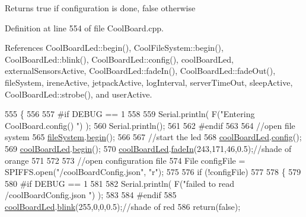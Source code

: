 \begin{DoxyReturn}{Returns}
true if configuration is done, false otherwise 
\end{DoxyReturn}


Definition at line 554 of file Cool\+Board.\+cpp.



References Cool\+Board\+Led\+::begin(), Cool\+File\+System\+::begin(), Cool\+Board\+Led\+::blink(), Cool\+Board\+Led\+::config(), cool\+Board\+Led, external\+Sensors\+Active, Cool\+Board\+Led\+::fade\+In(), Cool\+Board\+Led\+::fade\+Out(), file\+System, irene\+Active, jetpack\+Active, log\+Interval, server\+Time\+Out, sleep\+Active, Cool\+Board\+Led\+::strobe(), and user\+Active.


\begin{DoxyCode}
555 \{
556 
557 \textcolor{preprocessor}{#if DEBUG == 1}
558 
559     Serial.println( F(\textcolor{stringliteral}{"Entering CoolBoard.config() "}) );
560     Serial.println();
561 
562 \textcolor{preprocessor}{#endif}
563 
564     \textcolor{comment}{//open file system}
565     \hyperlink{classCoolBoard_a42c2586fbb13ff7f06538e9284e8538d}{fileSystem}.\hyperlink{classCoolFileSystem_a6ba6f666ed4c530174f8569d2c636748}{begin}();
566     
567     \textcolor{comment}{//start the led}
568     \hyperlink{classCoolBoard_a1b1d3c684a5baa56b08486e192fd8e97}{coolBoardLed}.\hyperlink{classCoolBoardLed_a1b60e5e30bea96c49ed62ed1bf1ffc8b}{config}();
569     \hyperlink{classCoolBoard_a1b1d3c684a5baa56b08486e192fd8e97}{coolBoardLed}.\hyperlink{classCoolBoardLed_ae3cbde8affcc6f011cbd698c8ef911f6}{begin}();
570     \hyperlink{classCoolBoard_a1b1d3c684a5baa56b08486e192fd8e97}{coolBoardLed}.\hyperlink{classCoolBoardLed_ab778f5e7bed0ab74e3906d82110493c3}{fadeIn}(243,171,46,0.5);\textcolor{comment}{//shade of orange     }
571 
572     
573     \textcolor{comment}{//open configuration file}
574     File configFile = SPIFFS.open(\textcolor{stringliteral}{"/coolBoardConfig.json"}, \textcolor{stringliteral}{"r"});
575     
576     \textcolor{keywordflow}{if} (!configFile)
577 
578     \{
579     
580 \textcolor{preprocessor}{    #if DEBUG == 1}
581 
582         Serial.println( F(\textcolor{stringliteral}{"failed to read /coolBoardConfig.json  "}) );
583 
584 \textcolor{preprocessor}{    #endif}
585         \hyperlink{classCoolBoard_a1b1d3c684a5baa56b08486e192fd8e97}{coolBoardLed}.\hyperlink{classCoolBoardLed_a96e1ea13003eee34c9dbcef340404426}{blink}(255,0,0,0.5);\textcolor{comment}{//shade of red     }
586         \textcolor{keywordflow}{return}(\textcolor{keyword}{false});

\end{DoxyCode}
